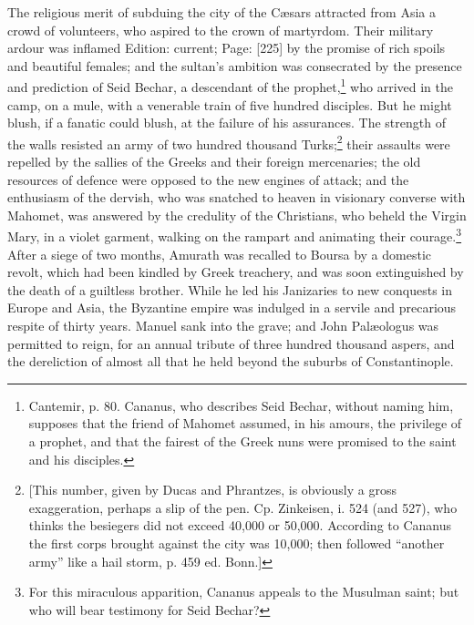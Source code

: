 The religious merit of subduing the city of the Cæsars attracted from Asia a crowd of volunteers, who aspired to the crown of martyrdom. Their military ardour was inflamed Edition: current; Page: [225] by the promise of rich spoils and beautiful females; and the sultan\texthebrew{}’s ambition was consecrated by the presence and prediction of Seid Bechar, a descendant of the prophet,\footnote{Cantemir, p. 80. Cananus, who describes Seid Bechar, without naming him, supposes that the friend of Mahomet assumed, in his amours, the privilege of a prophet, and that the fairest of the Greek nuns were promised to the saint and his disciples.} who arrived in the camp, on a mule, with a venerable train of five hundred disciples. But he might blush, if a fanatic could blush, at the failure of his assurances. The strength of the walls resisted an army of two hundred thousand Turks;\footnote{[This number, given by Ducas and Phrantzes, is obviously a gross exaggeration, perhaps a slip of the pen. Cp. Zinkeisen, i. 524 (and 527), who thinks the besiegers did not exceed 40,000 or 50,000. According to Cananus the first corps brought against the city was 10,000; then followed \texthebrew{“}another army\texthebrew{}” like a hail storm, p. 459 ed. Bonn.]} their assaults were repelled by the sallies of the Greeks and their foreign mercenaries; the old resources of defence were opposed to the new engines of attack; and the enthusiasm of the dervish, who was snatched to heaven in visionary converse with Mahomet, was answered by the credulity of the Christians, who beheld the Virgin Mary, in a violet garment, walking on the rampart and animating their courage.\footnote{For this miraculous apparition, Cananus appeals to the Musulman saint; but who will bear testimony for Seid Bechar?} After a siege of two months, Amurath was recalled to Boursa by a domestic revolt, which had been kindled by Greek treachery, and was soon extinguished by the death of a guiltless brother. While he led his Janizaries to new conquests in Europe and Asia, the Byzantine empire was indulged in a servile and precarious respite of thirty years. Manuel sank into the grave; and John Palæologus was permitted to reign, for an annual tribute of three hundred thousand aspers, and the dereliction of almost all that he held beyond the suburbs of Constantinople.

